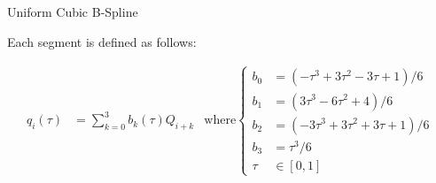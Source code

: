 \documentclass{beamer}
\begin{document}
\begin{frame}{Uniform Cubic B-Spline}
  
  Each segment is defined as follows:
  
  \begin{align*}
    q_i(\tau) &= \sum_{k=0}^{3} b_{k}(\tau) Q_{i+k}
    &
    \text{where}
    \begin{cases}
      b_0  &= (-\tau^3 + 3\tau^2 - 3\tau + 1) / 6 \\
      b_1  &= (3\tau^3 - 6\tau^2 + 4) / 6 \\
      b_2  &= (-3\tau^3 + 3\tau^2 + 3\tau + 1) / 6 \\
      b_3  &= \tau^3 / 6 \\
      \tau &\in [0,1]
    \end{cases}
  \end{align*}
  

\end{frame}
\end{document}
